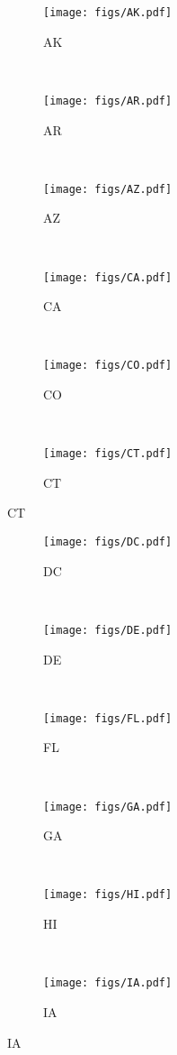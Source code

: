 \begin{figure}[tp]
	 \centering
	 \begin{subfigure}[b]{0.49\textwidth}
	 \centering
	 \texttt{[image: figs/AK.pdf]}
	 \caption{ AK }
	 \end{subfigure}
	 ~
	 \begin{subfigure}[b]{0.49\textwidth}
	 \centering
	 \texttt{[image: figs/AR.pdf]}
	 \caption{ AR }
	 \end{subfigure}
	 ~
	 \begin{subfigure}[b]{0.49\textwidth}
	 \centering
	 \texttt{[image: figs/AZ.pdf]}
	 \caption{ AZ }
	 \end{subfigure}
	 ~
	 \begin{subfigure}[b]{0.49\textwidth}
	 \centering
	 \texttt{[image: figs/CA.pdf]}
	 \caption{ CA }
	 \end{subfigure}
	 ~
	 \begin{subfigure}[b]{0.49\textwidth}
	 \centering
	 \texttt{[image: figs/CO.pdf]}
	 \caption{ CO }
	 \end{subfigure}
	 ~
	 \begin{subfigure}[b]{0.49\textwidth}
	 \centering
	 \texttt{[image: figs/CT.pdf]}
	 \caption{ CT }
	 \end{subfigure}
\end{figure}
\begin{figure}[tp]
	 \centering
	 \begin{subfigure}[b]{0.49\textwidth}
	 \centering
	 \texttt{[image: figs/DC.pdf]}
	 \caption{ DC }
	 \end{subfigure}
	 ~
	 \begin{subfigure}[b]{0.49\textwidth}
	 \centering
	 \texttt{[image: figs/DE.pdf]}
	 \caption{ DE }
	 \end{subfigure}
	 ~
	 \begin{subfigure}[b]{0.49\textwidth}
	 \centering
	 \texttt{[image: figs/FL.pdf]}
	 \caption{ FL }
	 \end{subfigure}
	 ~
	 \begin{subfigure}[b]{0.49\textwidth}
	 \centering
	 \texttt{[image: figs/GA.pdf]}
	 \caption{ GA }
	 \end{subfigure}
	 ~
	 \begin{subfigure}[b]{0.49\textwidth}
	 \centering
	 \texttt{[image: figs/HI.pdf]}
	 \caption{ HI }
	 \end{subfigure}
	 ~
	 \begin{subfigure}[b]{0.49\textwidth}
	 \centering
	 \texttt{[image: figs/IA.pdf]}
	 \caption{ IA }
	 \end{subfigure}
\end{figure}
